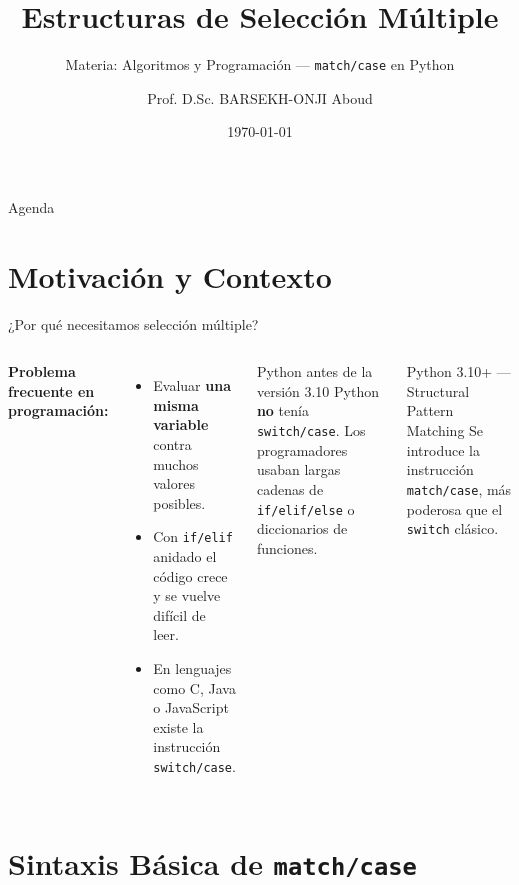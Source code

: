 \documentclass[aspectratio=169,xcolor=dvipsnames]{beamer}
\title{Estructuras de Selección Múltiple}
\subtitle{Materia: Algoritmos y Programación --- \texttt{match/case} en Python}
\author{Prof. D.Sc. BARSEKH-ONJI Aboud}
\institute{
    Facultad de Ingeniería \\
    Universidad Anáhuac México
}
\date{\today}
\begin{document}
\begin{frame}
    \titlepage
\end{frame}

\begin{frame}{Agenda}
    \tableofcontents
\end{frame}

\section{Motivación y Contexto}

\begin{frame}{¿Por qué necesitamos selección múltiple?}
    \begin{columns}
        \textbf{Problema frecuente en programación:}
        \begin{itemize}
            \item Evaluar \textbf{una misma variable} contra muchos valores posibles.
            \item Con \texttt{if/elif} anidado el código crece y se vuelve difícil de leer.
            \item En lenguajes como C, Java o JavaScript existe la instrucción \texttt{switch/case}.
        \end{itemize}
        \begin{alertblock}{Python antes de la versión 3.10}
            Python \textbf{no} tenía \texttt{switch/case}. Los programadores usaban largas cadenas de \texttt{if/elif/else} o diccionarios de funciones.
        \end{alertblock}
        \vspace{0.3cm}
        \begin{block}{Python 3.10+ — Structural Pattern Matching}
            Se introduce la instrucción \texttt{match/case}, más poderosa que el \texttt{switch} clásico.
        \end{block}
    \end{columns}
\end{frame}

\section{Sintaxis Básica de \texttt{match/case}}
\end{document}
